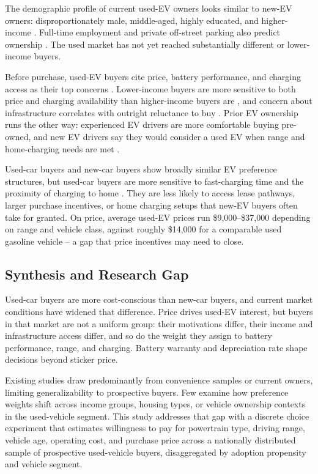 \documentclass[a4paper,fleqn]{cas-sc}   %
\begin{document}
The demographic profile of current used-EV owners looks similar to new-EV owners: disproportionately male, middle-aged, highly educated, and higher-income \parencite{sd2024usedEV_demographics1, sd2024usedEV_demographics2}. Full-time employment and private off-street parking also predict ownership \parencite{sd2024usedEV_demographics2}. The used market has not yet reached substantially different or lower-income buyers.

Before purchase, used-EV buyers cite price, battery performance, and charging access as their top concerns \parencite{trd2024usedEV_concerns}. Lower-income buyers are more sensitive to both price and charging availability than higher-income buyers are \parencite{trd2024usedEV_concerns}, and concern about infrastructure correlates with outright reluctance to buy \parencite{sd2024usedEV_demographics2}. Prior EV ownership runs the other way: experienced EV drivers are more comfortable buying pre-owned, and new EV drivers say they would consider a used EV when range and home-charging needs are met \parencite{trd2024usedEV_adoption}.

Used-car buyers and new-car buyers show broadly similar EV preference structures, but used-car buyers are more sensitive to fast-charging time and the proximity of charging to home \parencite{sagepub2020EVattributes}. They are less likely to access lease pathways, larger purchase incentives, or home charging setups that new-EV buyers often take for granted. On price, average used-EV prices run \$9,000--\$37,000 depending on range and vehicle class, against roughly \$14,000 for a comparable used gasoline vehicle \parencite{konstantinou2024usedEV_price} -- a gap that price incentives may need to close.

\subsection{Synthesis and Research Gap}

Used-car buyers are more cost-conscious than new-car buyers, and current market conditions have widened that difference. Price drives used-EV interest, but buyers in that market are not a uniform group: their motivations differ, their income and infrastructure access differ, and so do the weight they assign to battery performance, range, and charging. Battery warranty and depreciation rate shape decisions beyond sticker price.

Existing studies draw predominantly from convenience samples or current owners, limiting generalizability to prospective buyers. Few examine how preference weights shift across income groups, housing types, or vehicle ownership contexts in the used-vehicle segment. This study addresses that gap with a discrete choice experiment that estimates willingness to pay for powertrain type, driving range, vehicle age, operating cost, and purchase price across a nationally distributed sample of prospective used-vehicle buyers, disaggregated by adoption propensity and vehicle segment.
\end{document}
